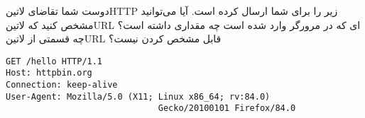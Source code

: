 \documentclass[../main.tex]{subfiles}
\begin{document}

دوست شما تقاضای ‌لاتین{HTTP} زیر را برای شما ارسال کرده است.
آیا می‌توانید مشخص کنید که ‌لاتین{URL} ای که در مرورگر وارد شده است چه مقداری داشته است؟
چه قسمتی از ‌لاتین{URL} قابل مشخص کردن نیست؟

\begin{latin}
\begin{verbatim}
GET /hello HTTP/1.1
Host: httpbin.org
Connection: keep-alive
User-Agent: Mozilla/5.0 (X11; Linux x86_64; rv:84.0)
                              Gecko/20100101 Firefox/84.0
\end{verbatim}
\end{latin}
\end{document}
